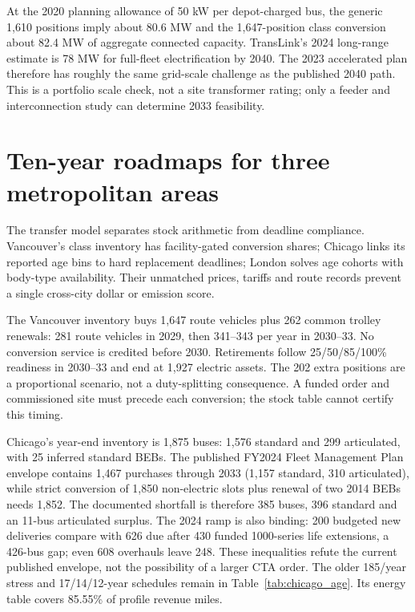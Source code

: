 \documentclass[12pt,letterpaper]{article}
\begin{document}


At the 2020 planning allowance of 50 kW per depot-charged bus, the generic 1,610 positions imply about 80.6 MW and the 1,647-position class conversion about 82.4 MW of aggregate connected capacity. TransLink's 2024 long-range estimate is 78 MW for full-fleet electrification by 2040. The 2023 accelerated plan therefore has roughly the same grid-scale challenge as the published 2040 path. This is a portfolio scale check, not a site transformer rating; only a feeder and interconnection study can determine 2033 feasibility.\cite{fleet2020,playbook2024}

\section{Ten-year roadmaps for three metropolitan areas}


The transfer model separates stock arithmetic from deadline compliance. Vancouver's class inventory has facility-gated conversion shares; Chicago links its reported age bins to hard replacement deadlines; London solves age cohorts with body-type availability. Their unmatched prices, tariffs and route records prevent a single cross-city dollar or emission score.

The Vancouver inventory buys 1,647 route vehicles plus 262 common trolley renewals: 281 route vehicles in 2029, then 341--343 per year in 2030--33. No conversion service is credited before 2030. Retirements follow 25/50/85/100\% readiness in 2030--33 and end at 1,927 electric assets. The 202 extra positions are a proportional scenario, not a duty-splitting consequence. A funded order and commissioned site must precede each conversion; the stock table cannot certify this timing.\cite{playbook2024,budget2025,budget2026}

Chicago's year-end inventory is 1,875 buses: 1,576 standard and 299 articulated, with 25 inferred standard BEBs. The published FY2024 Fleet Management Plan envelope contains 1,467 purchases through 2033 (1,157 standard, 310 articulated), while strict conversion of 1,850 non-electric slots plus renewal of two 2014 BEBs needs 1,852. The documented shortfall is therefore 385 buses, 396 standard and an 11-bus articulated surplus. The 2024 ramp is also binding: 200 budgeted new deliveries compare with 626 due after 430 funded 1000-series life extensions, a 426-bus gap; even 608 overhauls leave 248. These inequalities refute the current published envelope, not the possibility of a larger CTA order. The older 185/year stress and 17/14/12-year schedules remain in Table~\ref{tab:chicago_age}. Its energy table covers 85.55\% of profile revenue miles.\cite{ctaprofile,ctaage,ctaenergy,ctanotice,ctafmp}
\end{document}
